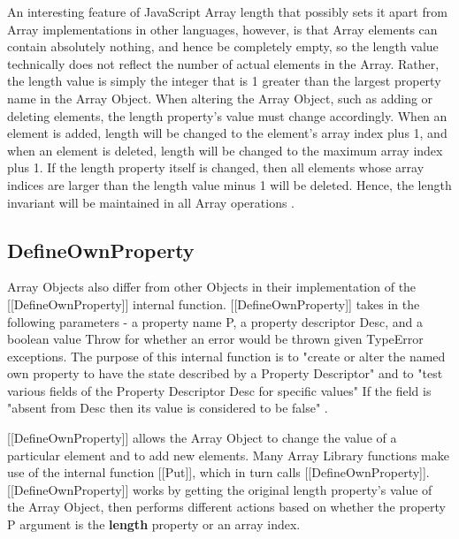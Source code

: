 \documentclass[a4paper,11pt,twoside]{report}
\begin{document}
An interesting feature of JavaScript Array length that possibly sets it apart from Array implementations in other languages, however, is that Array elements can contain absolutely nothing, and hence be completely empty, so the length value technically does not reflect the number of actual elements in the Array. Rather, the length value is simply the integer that is 1 greater than the largest property name in the Array Object. When altering the Array Object, such as adding or deleting elements, the length property's value must change accordingly. When an element is added, length will be changed to the element's array index plus 1, and when an element is deleted, length will be changed to the maximum array index plus 1. If the length property itself is changed, then all elements whose array indices are larger than the length value minus 1 will be deleted. Hence, the length invariant will be maintained in all Array operations \cite{EcmaScript}.

\subsection{DefineOwnProperty}
Array Objects also differ from other Objects in their implementation of the [[DefineOwnProperty]] internal function. [[DefineOwnProperty]] takes in the following parameters - a property name P, a property descriptor Desc, and a boolean value Throw for whether an error would be thrown given TypeError exceptions. The purpose of this internal function is to "create or alter the named own property to have the state described by a Property Descriptor" and to "test various fields of the Property Descriptor Desc for specific values" If the field is "absent from Desc then its value is considered to be false" \cite{EcmaScript}. 

[[DefineOwnProperty]] allows the Array Object to change the value of a particular element and to add new elements. Many Array Library functions make use of the internal function [[Put]], which in turn calls [[DefineOwnProperty]]. [[DefineOwnProperty]] works by getting the original length property's value of the Array Object, then performs different actions based on whether the property P argument is the \textbf{length} property or an array index. 
\end{document}
